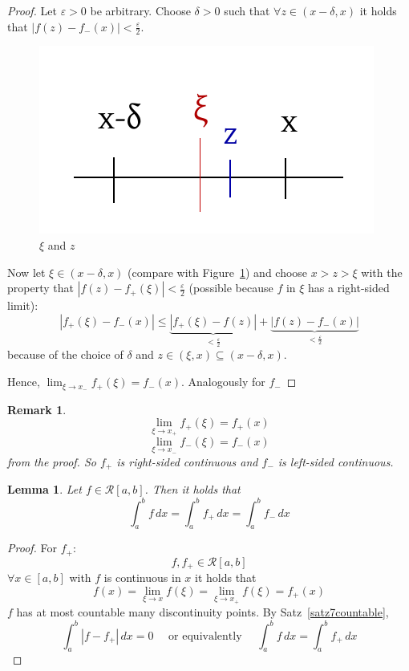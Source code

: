 \documentclass{article}
\newtheorem{lemma}{Lemma}  \numberwithin{lemma}{section}
\newtheorem{remark}{Remark}  \numberwithin{remark}{section}
\newcommand{\card}[1]{\left|#1\right|}
\begin{document}
\begin{proof}
  Let $\varepsilon > 0$ be arbitrary. Choose $\delta > 0$ such that $\forall z \in (x - \delta, x)$ it holds that $\card{f(z) - f_-(x)} < \frac\varepsilon2$.

  \begin{figure}[t]
    \begin{center}
      \includegraphics{img/21_xi_z.pdf}
      \caption{$\xi$ and $z$}
      \label{img:xiz}
    \end{center}
  \end{figure}

  Now let $\xi \in (x - \delta, x)$ (compare with Figure~\ref{img:xiz}) and choose $x > z > \xi$ with the property that $\card{f(z) - f_+(\xi)} < \frac\varepsilon2$ (possible because $f$ in $\xi$ has a right-sided limit):
  \[
    \card{f_+(\xi) - f_-(x)}
    \leq \underbrace{\card{f_+(\xi) - f(z)}}_{< \frac\varepsilon2} + \underbrace{\card{f(z) - f_-(x)}}_{< \frac\varepsilon2}
  \]
  because of the choice of $\delta$ and $z \in (\xi, x) \subseteq (x - \delta, x)$.

  Hence, $\lim_{\xi \to x_-} f_+(\xi) = f_-(x)$. Analogously for $f_-$
\end{proof}

\begin{remark}
  \[ \lim_{\xi \to x_+} f_+(\xi) = f_+(x) \]
  \[ \lim_{\xi \to x_-} f_-(\xi) = f_-(x) \]
  from the proof. So $f_+$ is right-sided continuous and $f_-$ is left-sided continuous.
\end{remark}

\begin{lemma} %
  Let $f \in \mathcal R[a,b]$. Then it holds that
  \[ \int_a^b f \, dx = \int_a^b f_+ \, dx = \int_a^b f_- \, dx \]
\end{lemma}

\begin{proof}
  For $f_+$:
  \[ f, f_+ \in \mathcal R[a,b] \]
  $\forall x \in [a,b]$ with $f$ is continuous in $x$ it holds that
  \[ f(x) = \lim_{\xi\to x} f(\xi) = \lim_{\xi\to x_+} f(\xi) = f_+(x) \]
  $f$ has at most countable many discontinuity points. By Satz~\ref{satz7countable},
  \[
    \int_a^b \card{f - f_+} \, dx = 0
    \quad \text{ or equivalently } \quad
    \int_a^b f \, dx = \int_a^b f_+ \, dx
  \]
\end{proof}
\end{document}
